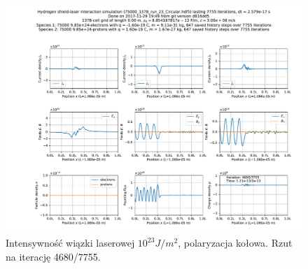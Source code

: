 \begin{figure}[h!]
  \includegraphics[width=\textwidth]{Images/75000_1378_run_23_Circular_004680}
  \caption{Intensywność wiązki laserowej $10^{23} J/m^2$, polaryzacja kołowa. Rzut na iterację 4680/7755.\label{fig:laser-23-Circular-snapshot}}
\end{figure}


